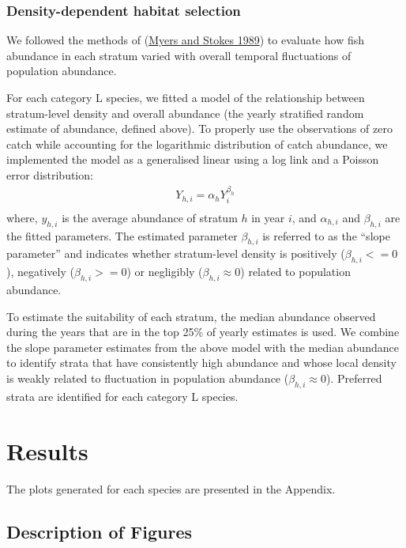 \documentclass[12pt]{article}\usepackage[]{graphicx}\usepackage[]{color}
\begin{document}
\hypertarget{density-dependent-habitat-selection}{%
\subsubsection{Density-dependent habitat selection}\label{density-dependent-habitat-selection}}

We followed the methods of (\protect\hyperlink{ref-Myers:Stokes:1989}{Myers and Stokes 1989}) to evaluate how fish abundance in each stratum varied with overall temporal fluctuations of population abundance.

For each category L species, we fitted a model of the relationship between stratum-level density and overall abundance (the yearly stratified random estimate of abundance, defined above). To properly use the observations of zero catch while accounting for the logarithmic distribution of catch abundance, we implemented the model as a generalised linear using a log link and a Poisson error distribution:
\begin{eqnarray*}\label{eqHabitat Selection}
Y_{h,i} = \alpha_{h} Y_{i}^{\beta_h}
\\
\end{eqnarray*}
where, \(y_{h,i}\) is the average abundance of stratum \(h\) in year \(i\), and \(\alpha_{h,i}\) and \(\beta_{h,i}\) are the fitted parameters. The estimated parameter \(\beta_{h,i}\) is referred to as the ``slope parameter'' and indicates whether stratum-level density is positively (\(\beta_{h,i} <= 0\)), negatively (\(\beta_{h,i} >= 0\)) or negligibly (\(\beta_{h,i} \approx 0\)) related to population abundance.

To estimate the suitability of each stratum, the median abundance observed during the years that are in the top 25\% of yearly estimates is used. We combine the slope parameter estimates from the above model with the median abundance to identify strata that have consistently high abundance and whose local density is weakly related to fluctuation in population abundance (\(\beta_{h,i} \approx 0\)). Preferred strata are identified for each category L species.

\hypertarget{results}{%
\section{Results}\label{results}}

The plots generated for each species are presented in the Appendix.

\hypertarget{description-of-figures}{%
\subsection{Description of Figures}\label{description-of-figures}}
\end{document}
